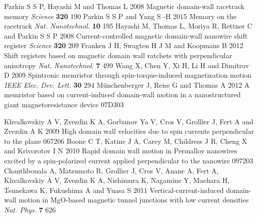 \documentclass[12pt]{iopart}
\begin{document}
\begin{thebibliography}{99}
 Parkin S S P, Hayashi M and Thomas L 2008 Magnetic domain-wall racetrack memory {\it Science}  {\bf 320} 190
 Parkin S S P and Yang S -H 2015 Memory on the racetrack {\it Nat. Nanotechnol.} {\bf 10} 195
 Hayashi M, Thomas L, Moriya R, Rettner C and Parkin S S P 2008 Current-controlled magnetic domain-wall nanowire shift register {\it Science} {\bf 320} 209
 Franken J H, Swagten H J M and Koopmans B 2012 Shift registers based on magnetic domain wall ratchets with perpendicular anisotropy {\it Nat. Nanotechnol.} {\bf 7} 499
 Wang X, Chen Y, Xi H, Li H and Dimitrov D 2009 Spintronic memristor through spin-torque-induced magnetization motion {\it IEEE Elec. Dev. Lett.} {\bf 30} 294
 M\"{u}nchenberger J, Reiss G and Thomas A 2012 A memristor based on current-induced domain-wall motion in a nanostructured giant magnetoresistance device  07D303

 Khvalkovskiy A V, Zvezdin K A, Gorbunov Ya V, Cros V, Grollier J, Fert A and Zvezdin A K 2009 High domain wall velocities due to spin currents perpendicular to the plane  067206
 Boone C T, Katine J A, Carey M, Childress J R, Cheng X and Krivorotov I N 2010 Rapid domain wall motion in Permalloy nanowires excited by a spin-polarized current applied perpendicular to the nanowire  097203
 Chanthbouala A, Matsumoto R, Grollier J, Cros V, Anane A, Fert A, Khvalkovskiy A V, Zvezdin K A, Nishimura K, Nagamine Y, Maehara H, Tsunekawa K, Fukushima A and Yuasa S 2011 Vertical-current-induced domain-wall motion in MgO-based magnetic tunnel junctions with low current densities {\it Nat. Phys.} {\bf 7} 626


\end{thebibliography}
\end{document}
